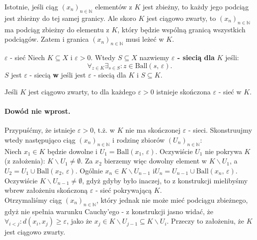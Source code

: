 \documentclass{article}
\numberwithin{defi}{section}
\numberwithin{defi}{section}
\newcommand{\N}{\mathbb{N}}
\providecommand{\eps}{\varepsilon}
\newcommand{\ciag}[1]{(#1_{n})_{n \in \N}}
\newcommand{\ball}[2]{\text{Ball}(#1, \, #2)}
\begin{document}
    \begin{dow}
        Istotnie, jeśli ciąg $\ciag{x}$ elementów z $K$ jest zbieżny, to każdy jego podciąg jest zbieżny do tej samej granicy. Ale skoro $K$ jest ciągowo zwarty, to $\ciag{x}$ ma podciąg zbieżny do elementu z $K$, który będzie wspólną granicą wszystkich podciągów. Zatem i granica $\ciag{x}$ musi leżeć w $K$. 
    \end{dow}


    \begin{defr}{$\eps$ - sieć} \label{defr:eps-siec}
        Niech $K \subseteq X$ i $\eps > 0$. Wtedy $S \subseteq X$ nazwiemy \textbf{$\eps$ - siecią dla} $K$ jeśli: \begin{equation}
            \forall_{z \in K} \exists_{s \in S}: z \in \ball{s}{\eps}.
        \end{equation} $S$ jest $\eps$ - siecią \textbf{w} jeśli jest $\eps$ - siecią dla $K$ i $S \subseteq K$.
    \end{defr}


    \begin{twier}{}\label{twier:sk-eps-siec}
        Jeśli $K$ jest ciągowo zwarty, to dla każdego $\eps > 0$ istnieje skończona $\eps$ - sieć w $K$.
    \end{twier}

    \begin{dow}
        \paragraph{Dowód nie wprost.} Przypuśćmy, że istnieje $\eps > 0$, t.ż. w $K$ nie ma skończonej $\eps$ - sieci. Skonstruujmy wtedy następująco ciąg $\ciag{x}$ i rodzinę zbiorów $\ciag{U}$:\\
         Niech $x_1 \in K$ będzie dowolne i $U_1 = \ball{x_1}{\eps}$. Oczywiście $U_1$ nie pokrywa $K$ (z założenia): $K \backslash U_1 \neq \emptyset$. Za $x_2$ bierzemy więc dowolny element w $K \backslash U_1$, a $U_2 = U_1 \cup \ball{x_2}{\eps}$. Ogólnie $x_n \in K \backslash U_{n-1}$ i$U_n = U_{n-1} \cup \ball{x_{n}}{\eps}$. Oczywiście $K \backslash U_{n-1} \neq \emptyset$, gdyż gdyby było inaczej, to z konstrukcji mielibyśmy wbrew założeniu skończoną $\eps$ - sieć pokrywającą $K$. \\
         Otrzymaliśmy ciąg $\ciag{x}$, który jednak nie może mieć podciągu zbieżnego, gdyż nie spełnia warunku Cauchy'ego - z konstrukcji jasno widać, że $\forall_{i < j}: d(x_i, x_j) \geqslant \eps$, jako że $x_j \in K \backslash U_{j-1} \subseteq K \backslash U_i$. Przeczy to założeniu, że $K$ jest ciągowo zwarty.
    \end{dow}
\end{document}
